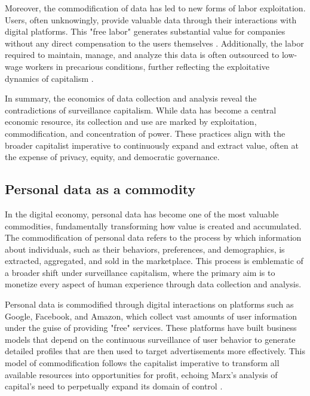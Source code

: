\begin{refsection}
Moreover, the commodification of data has led to new forms of labor exploitation. Users, often unknowingly, provide valuable data through their interactions with digital platforms. This "free labor" generates substantial value for companies without any direct compensation to the users themselves \cite[pp.~21-23]{fuchs2014digital}. Additionally, the labor required to maintain, manage, and analyze this data is often outsourced to low-wage workers in precarious conditions, further reflecting the exploitative dynamics of capitalism \cite[pp.~189-191]{scholz2016uberworked}.

In summary, the economics of data collection and analysis reveal the contradictions of surveillance capitalism. While data has become a central economic resource, its collection and use are marked by exploitation, commodification, and concentration of power. These practices align with the broader capitalist imperative to continuously expand and extract value, often at the expense of privacy, equity, and democratic governance.

\subsection{Personal data as a commodity}

In the digital economy, personal data has become one of the most valuable commodities, fundamentally transforming how value is created and accumulated. The commodification of personal data refers to the process by which information about individuals, such as their behaviors, preferences, and demographics, is extracted, aggregated, and sold in the marketplace. This process is emblematic of a broader shift under surveillance capitalism, where the primary aim is to monetize every aspect of human experience through data collection and analysis.

Personal data is commodified through digital interactions on platforms such as Google, Facebook, and Amazon, which collect vast amounts of user information under the guise of providing "free" services. These platforms have built business models that depend on the continuous surveillance of user behavior to generate detailed profiles that are then used to target advertisements more effectively. This model of commodification follows the capitalist imperative to transform all available resources into opportunities for profit, echoing Marx's analysis of capital's need to perpetually expand its domain of control \cite[pp.~136-139]{marx2008capital}.


\end{refsection}

